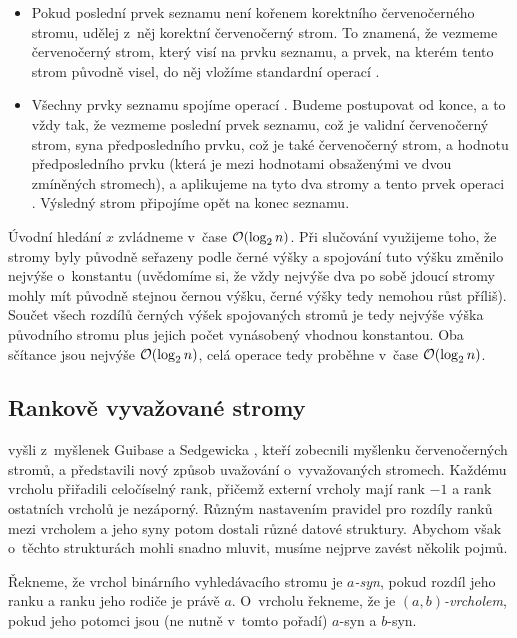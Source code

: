 \begin{enumerate}
\begin{itemize}
\item Pokud poslední prvek seznamu není kořenem korektního červenočerného
stromu, udělej z~něj korektní červenočerný strom. To znamená, že vezmeme
červenočerný strom, který visí na prvku seznamu, a prvek, na kterém tento strom původně
visel, do něj vložíme standardní operací .

\item Všechny prvky seznamu spojíme operací . Budeme postupovat od
konce, a to vždy tak, že vezmeme poslední prvek seznamu, což je validní
červenočerný strom, syna předposledního prvku, což je také červenočerný strom,
a hodnotu předposledního prvku (která je mezi hodnotami obsaženými ve dvou zmíněných stromech), a aplikujeme na tyto dva stromy
a tento prvek operaci . Výsledný strom připojíme opět na konec
seznamu. 

\end{itemize}
\end{enumerate}

Úvodní hledání $x$ zvládneme v~čase $\o(\log n)$. Při slučování využijeme
toho, že stromy byly původně seřazeny podle černé výšky a spojování tuto výšku
změnilo nejvýše o~konstantu (uvědomíme si, že vždy nejvýše dva po sobě jdoucí
stromy mohly mít původně stejnou černou výšku, černé výšky tedy nemohou růst
příliš). Součet všech rozdílů černých výšek spojovaných stromů je tedy nejvýše
výška původního stromu plus jejich počet vynásobený vhodnou konstantou. Oba sčítance jsou
nejvýše $\o(\log n)$, celá operace  tedy proběhne v~čase $\o(\log
n)$.

\subsection{Rankově vyvažované stromy}

\citet{rankbalanced} vyšli z~myšlenek Guibase a Sedgewicka \citeyearpar{redblack}, kteří zobecnili
myšlenku červenočerných stromů, a představili nový způsob uvažování
o~vyvažovaných stromech. Každému vrcholu přiřadili celočíselný rank, přičemž
externí vrcholy mají rank $-1$ a rank ostatních vrcholů je nezáporný. Různým
nastavením pravidel pro rozdíly ranků mezi vrcholem a jeho syny potom dostali
různé datové struktury. Abychom však o~těchto strukturách mohli snadno mluvit,
musíme nejprve zavést několik pojmů.

\begin{definice}
Řekneme, že vrchol binárního vyhledávacího stromu je \emph{$a$-syn}, pokud rozdíl jeho ranku a ranku jeho rodiče je právě $a$. O~vrcholu řekneme, že je \emph{$(a,b)$-vrcholem}, pokud jeho potomci jsou (ne nutně v~tomto pořadí) $a$-syn a $b$-syn.
\end{definice}

